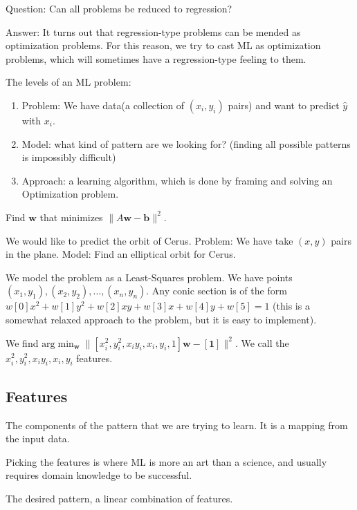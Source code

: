 \documentclass[11pt]{scrartcl}
\newcommand{\Vw}{\mathbf{w}}
\newcommand{\Vb}{\mathbf{b}}
\begin{document}
Question: Can all problems be reduced to regression?

Answer:  It turns out that regression-type problems can be mended as optimization problems.  For this reason, we try to cast ML as optimization problems, which will sometimes have a regression-type feeling to them.

The levels of an ML problem:
\begin{enumerate}
\item Problem: We have data(a collection of $(x_i, y_i)$ pairs) and want to predict $\hat{y}$ with $x_i$.
\item Model: what kind of pattern are we looking for?  (finding all possible patterns is impossibly difficult)
\item Approach: a learning algorithm, which is done by framing and solving an Optimization problem.
\end{enumerate}

\begin{definition} Find $\Vw$ that minimizes $\|A\Vw - \Vb\|^2$.
\end{definition}

\begin{example} We would like to predict the orbit of Cerus.  Problem: We have take $(x, y)$ pairs in the plane.  
Model: Find an elliptical orbit for Cerus.  
\end{example}
We model the problem as a Least-Squares problem. We have points $(x_1, y_1), (x_2, y_2), \dots, (x_n, y_n)$.  Any conic section is of the form $w[0]x^2 + w[1]y^2 + w[2]xy + w[3]x + w[4]y + w[5] = 1$ (this is a somewhat relaxed approach to the problem, but it is easy to implement).

We find $\text{arg}\min_{\Vw} \| [x_i^2, y_i^2, x_iy_i, x_i, y_i, 1]\Vw - [\mathbf{1}]\|^2$.   We call the $x_i^2, y_i^2, x_iy_i, x_i, y_i$ features.

\subsection{Features}
\begin{definition}[Features] The components of the pattern that we are trying to learn.  It is a mapping from the input data.
\end{definition}
Picking the features is where ML is more an art than a science, and usually requires domain knowledge to be successful.
\begin{definition} The desired pattern, a linear combination of features.
\end{definition}
\end{document}

